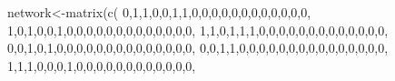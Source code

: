 \documentclass[
  notitlepage,
  onecolumn,
  openany]{book}
\newenvironment{Shaded}{\begin{snugshade}}{\end{snugshade}}
\newcommand{\DecValTok}[1]{\textcolor[rgb]{0.00,0.00,0.81}{#1}}
\newcommand{\FunctionTok}[1]{\textcolor[rgb]{0.00,0.00,0.00}{#1}}
\newcommand{\NormalTok}[1]{#1}
\newcommand{\OtherTok}[1]{\textcolor[rgb]{0.56,0.35,0.01}{#1}}
\begin{document}
\begin{Shaded}
\begin{Highlighting}[]
\NormalTok{network}\OtherTok{\textless{}{-}}\FunctionTok{matrix}\NormalTok{(}\FunctionTok{c}\NormalTok{(}
  \DecValTok{0}\NormalTok{,}\DecValTok{1}\NormalTok{,}\DecValTok{1}\NormalTok{,}\DecValTok{0}\NormalTok{,}\DecValTok{0}\NormalTok{,}\DecValTok{1}\NormalTok{,}\DecValTok{1}\NormalTok{,}\DecValTok{0}\NormalTok{,}\DecValTok{0}\NormalTok{,}\DecValTok{0}\NormalTok{,}\DecValTok{0}\NormalTok{,}\DecValTok{0}\NormalTok{,}\DecValTok{0}\NormalTok{,}\DecValTok{0}\NormalTok{,}\DecValTok{0}\NormalTok{,}\DecValTok{0}\NormalTok{,}\DecValTok{0}\NormalTok{,}\DecValTok{0}\NormalTok{,}\DecValTok{0}\NormalTok{,}
  \DecValTok{1}\NormalTok{,}\DecValTok{0}\NormalTok{,}\DecValTok{1}\NormalTok{,}\DecValTok{0}\NormalTok{,}\DecValTok{0}\NormalTok{,}\DecValTok{1}\NormalTok{,}\DecValTok{0}\NormalTok{,}\DecValTok{0}\NormalTok{,}\DecValTok{0}\NormalTok{,}\DecValTok{0}\NormalTok{,}\DecValTok{0}\NormalTok{,}\DecValTok{0}\NormalTok{,}\DecValTok{0}\NormalTok{,}\DecValTok{0}\NormalTok{,}\DecValTok{0}\NormalTok{,}\DecValTok{0}\NormalTok{,}\DecValTok{0}\NormalTok{,}\DecValTok{0}\NormalTok{,}\DecValTok{0}\NormalTok{,}
  \DecValTok{1}\NormalTok{,}\DecValTok{1}\NormalTok{,}\DecValTok{0}\NormalTok{,}\DecValTok{1}\NormalTok{,}\DecValTok{1}\NormalTok{,}\DecValTok{1}\NormalTok{,}\DecValTok{0}\NormalTok{,}\DecValTok{0}\NormalTok{,}\DecValTok{0}\NormalTok{,}\DecValTok{0}\NormalTok{,}\DecValTok{0}\NormalTok{,}\DecValTok{0}\NormalTok{,}\DecValTok{0}\NormalTok{,}\DecValTok{0}\NormalTok{,}\DecValTok{0}\NormalTok{,}\DecValTok{0}\NormalTok{,}\DecValTok{0}\NormalTok{,}\DecValTok{0}\NormalTok{,}\DecValTok{0}\NormalTok{,}
  \DecValTok{0}\NormalTok{,}\DecValTok{0}\NormalTok{,}\DecValTok{1}\NormalTok{,}\DecValTok{0}\NormalTok{,}\DecValTok{1}\NormalTok{,}\DecValTok{0}\NormalTok{,}\DecValTok{0}\NormalTok{,}\DecValTok{0}\NormalTok{,}\DecValTok{0}\NormalTok{,}\DecValTok{0}\NormalTok{,}\DecValTok{0}\NormalTok{,}\DecValTok{0}\NormalTok{,}\DecValTok{0}\NormalTok{,}\DecValTok{0}\NormalTok{,}\DecValTok{0}\NormalTok{,}\DecValTok{0}\NormalTok{,}\DecValTok{0}\NormalTok{,}\DecValTok{0}\NormalTok{,}\DecValTok{0}\NormalTok{,}
  \DecValTok{0}\NormalTok{,}\DecValTok{0}\NormalTok{,}\DecValTok{1}\NormalTok{,}\DecValTok{1}\NormalTok{,}\DecValTok{0}\NormalTok{,}\DecValTok{0}\NormalTok{,}\DecValTok{0}\NormalTok{,}\DecValTok{0}\NormalTok{,}\DecValTok{0}\NormalTok{,}\DecValTok{0}\NormalTok{,}\DecValTok{0}\NormalTok{,}\DecValTok{0}\NormalTok{,}\DecValTok{0}\NormalTok{,}\DecValTok{0}\NormalTok{,}\DecValTok{0}\NormalTok{,}\DecValTok{0}\NormalTok{,}\DecValTok{0}\NormalTok{,}\DecValTok{0}\NormalTok{,}\DecValTok{0}\NormalTok{,}
  \DecValTok{1}\NormalTok{,}\DecValTok{1}\NormalTok{,}\DecValTok{1}\NormalTok{,}\DecValTok{0}\NormalTok{,}\DecValTok{0}\NormalTok{,}\DecValTok{0}\NormalTok{,}\DecValTok{1}\NormalTok{,}\DecValTok{0}\NormalTok{,}\DecValTok{0}\NormalTok{,}\DecValTok{0}\NormalTok{,}\DecValTok{0}\NormalTok{,}\DecValTok{0}\NormalTok{,}\DecValTok{0}\NormalTok{,}\DecValTok{0}\NormalTok{,}\DecValTok{0}\NormalTok{,}\DecValTok{0}\NormalTok{,}\DecValTok{0}\NormalTok{,}\DecValTok{0}\NormalTok{,}\DecValTok{0}\NormalTok{,}

\end{Highlighting}
\end{Shaded}
\end{document}
